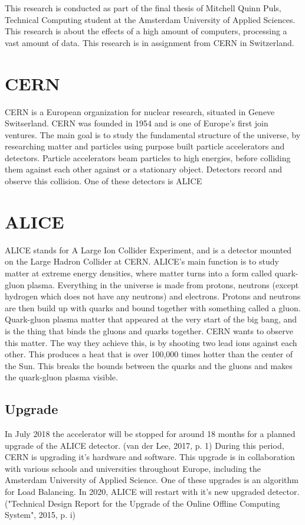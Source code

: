 This research is conducted as part of the final thesis of Mitchell Quinn Puls, Technical Computing student at the Amsterdam University of Applied Sciences. This research is about the effects of a high amount of computers, processing a vast amount of data. This research is in assignment from CERN in Switzerland. 
\section{CERN}
CERN is a European organization for  nuclear research, situated in Geneve Switserland. CERN was founded in 1954 and is one of Europe's first join ventures. The main goal is to study the fundamental structure of the universe, by researching matter and particles using purpose built particle accelerators and detectors. Particle accelerators beam particles to high energies, before colliding them against each other against or a stationary object. Detectors record and observe this collision. One of these detectors is ALICE
\section{ALICE}
ALICE stands for A Large Ion Collider Experiment, and is a detector mounted on the Large Hadron Collider at CERN.  ALICE's main function is to study matter at extreme energy densities, where matter turns into a form called quark-gluon plasma. Everything in the universe is made from protons, neutrons (except hydrogen which does not have any neutrons) and electrons. Protons and neutrons are then build up with quarks and bound together with something called a gluon. Quark-gluon plasma matter that appeared at the very start of the big bang, and is the thing that binds the gluons and quarks together. CERN wants to observe this matter. The way they achieve this, is by shooting two lead ions against each other. This produces a heat that is over 100,000 times hotter than the center of the Sun. This breaks the bounds between the quarks and the gluons and makes the quark-gluon plasma visible.
\subsection{Upgrade}
In July 2018 the accelerator will be stopped for around 18 months for a planned upgrade of the ALICE detector. (van der Lee, 2017, p. 1) During this period, CERN is upgrading it's hardware and software. This upgrade is in collaboration with various schools and universities throughout Europe, including the Amsterdam University of Applied Science. One of these upgrades is an algorithm for Load Balancing. In 2020, ALICE will restart with it's new upgraded detector. ("Technical Design Report for the Upgrade of the Online Offline Computing System", 2015, p. i)

